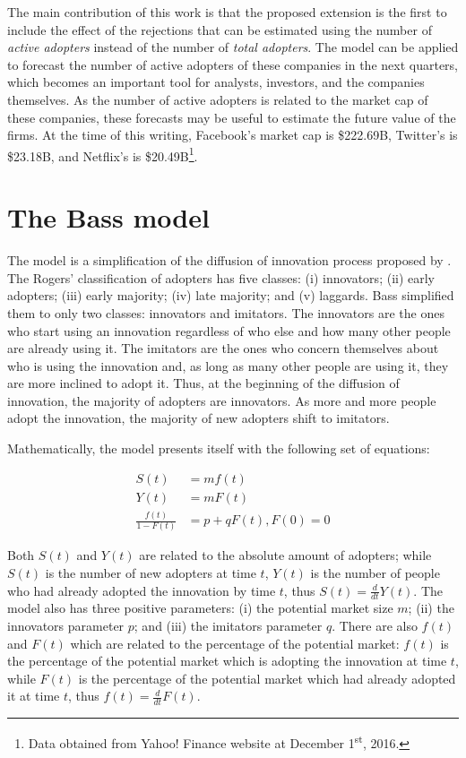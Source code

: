 The main contribution of this work is that the proposed extension is the first to include the effect of the rejections that can be estimated using the number of \textit{active adopters} instead of the number of \textit{total adopters}. The model can be applied to forecast the number of active adopters of these companies in the next quarters, which becomes an important tool for analysts, investors, and the companies themselves. As the number of active adopters is related to the market cap of these companies, these forecasts may be useful to estimate the future value of the firms. At the time of this writing, Facebook's market cap is \$222.69B, Twitter's is \$23.18B, and Netflix's is \$20.49B\footnote{Data obtained from Yahoo! Finance website at December 1\textsuperscript{st}, 2016.}.


\chapter{The Bass model}

The \citet{bass1969} model is a simplification of the diffusion of innovation process proposed by \citet{rogers1962diffusion}. The Rogers' classification of adopters has five classes: (i) innovators; (ii) early adopters; (iii) early majority; (iv) late majority; and (v) laggards. Bass simplified them to only two classes: innovators and imitators. The innovators are the ones who start using an innovation regardless of who else and how many other people are already using it. The imitators are the ones who concern themselves about who is using the innovation and, as long as many other people are using it, they are more inclined to adopt it. Thus, at the beginning of the diffusion of innovation, the majority of adopters are innovators. As more and more people adopt the innovation, the majority of new adopters shift to imitators.

Mathematically, the model presents itself with the following set of equations:

\begin{align}
S(t) &= mf(t) \\
Y(t) &= mF(t) \\
\frac{f(t)}{1-F(t)} &= p + qF(t), F(0)=0 \label{eq:bass:ode}
\end{align}

Both $S(t)$ and $Y(t)$ are related to the absolute amount of adopters; while $S(t)$ is the number of new adopters at time $t$, $Y(t)$ is the number of people who had already adopted the innovation by time $t$, thus $S(t) = \frac{d}{dt} Y(t)$. The model also has three positive parameters: (i) the potential market size $m$; (ii) the innovators parameter $p$; and (iii) the imitators parameter $q$. There are also $f(t)$ and $F(t)$ which are related to the percentage of the potential market: $f(t)$ is the percentage of the potential market which is adopting the innovation at time $t$, while $F(t)$ is the percentage of the potential market which had already adopted it at time $t$, thus $f(t) = \frac{d}{dt} F(t)$.

